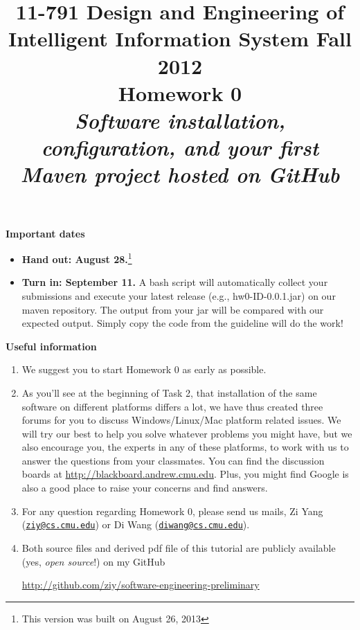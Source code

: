 \documentclass[oneside]{memoir}
\title{{\bfseries 11-791 Design and Engineering of Intelligent Information
System Fall 2012\\Homework 0}\\
\vspace{1em}
\itshape\rmfamily Software installation, configuration, and your first Maven
project hosted on GitHub}
\date{}
\begin{document}
\begin{titlingpage}
\maketitle

\hspace{-0.1\textwidth}
\begin{minipage}{1.2\textwidth}
\vspace{-5em}
\textbf{Important dates}
\begin{itemize}

\item \textbf{Hand out: August 28.}\footnote{This version was built on
August 26, 2013}

\item \textbf{Turn in: September 11.} A bash script will automatically collect
your submissions and execute your latest release (e.g., hw0-ID-0.0.1.jar) on our
maven repository. The output from your jar will be compared with our expected
output. Simply copy the code from the guideline will do the work!
\end{itemize}

\textbf{Useful information}
\begin{enumerate}
\item We suggest you to start Homework 0 as early as possible.

\item As you'll see at the beginning of Task 2, that installation of the same
software on different platforms differs a lot, we have thus created three forums
for you to discuss Windows/Linux/Mac platform related issues. We will try our
best to help you solve whatever problems you might have, but we also encourage
you, the experts in any of these platforms, to work with us to answer the
questions from your classmates. You can find the discussion boards at
\url{http://blackboard.andrew.cmu.edu}. Plus, you might find Google is also a
good place to raise your concerns and find answers.

\item For any question regarding Homework 0, please send us mails, Zi Yang
(\href{mailto:ziy@cs.cmu.edu}{\nolinkurl{ziy@cs.cmu.edu}}) or Di Wang
(\href{mailto:diwang@cs.cmu.edu}{\nolinkurl{diwang@cs.cmu.edu}}).

\item Both source files and derived pdf file of this tutorial are publicly
available (yes, \emph{open source}!) on my GitHub

\url{http://github.com/ziy/software-engineering-preliminary}


\end{enumerate}
\end{minipage}
\end{titlingpage}
\end{document}
